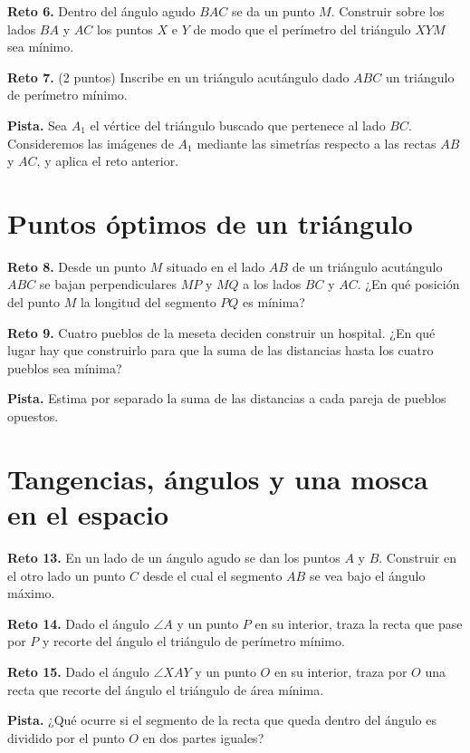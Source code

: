 \documentclass[11pt,a4paper]{article}
\begin{document}
\newpage

\textbf{Reto 6.} Dentro del ángulo agudo $BAC$ se da un punto $M$. Construir sobre los lados $BA$ y $AC$ los puntos $X$ e $Y$ de modo que el perímetro del triángulo $XYM$ sea mínimo.

\newpage

\textbf{Reto 7.} (2 puntos) Inscribe en un triángulo acutángulo dado $ABC$ un triángulo de perímetro mínimo.

\textbf{Pista.} Sea $A_1$ el vértice del triángulo buscado que pertenece al lado $BC$. Consideremos las imágenes de $A_1$ mediante las simetrías respecto a las rectas $AB$ y $AC$, y aplica el reto anterior.

\newpage

\section*{Puntos óptimos de un triángulo}

\textbf{Reto 8.} Desde un punto $M$ situado en el lado $AB$ de un triángulo acutángulo $ABC$ se bajan perpendiculares $MP$ y $MQ$ a los lados $BC$ y $AC$. ¿En qué posición del punto $M$ la longitud del segmento $PQ$ es mínima?

\newpage

\textbf{Reto 9.} Cuatro pueblos de la meseta deciden construir un hospital. ¿En qué lugar hay que construirlo para que la suma de las distancias hasta los cuatro pueblos sea mínima?

\textbf{Pista.} Estima por separado la suma de las distancias a cada pareja de pueblos opuestos.

\newpage

\section*{Tangencias, ángulos y una mosca en el espacio}

\textbf{Reto 13.} En un lado de un ángulo agudo se dan los puntos $A$ y $B$. Construir en el otro lado un punto $C$ desde el cual el segmento $AB$ se vea bajo el ángulo máximo.

\newpage

\textbf{Reto 14.} Dado el ángulo $\angle A$ y un punto $P$ en su interior, traza la recta que pase por $P$ y recorte del ángulo el triángulo de perímetro mínimo.

\newpage

\textbf{Reto 15.} Dado el ángulo $\angle XAY$ y un punto $O$ en su interior, traza por $O$ una recta que recorte del ángulo el triángulo de área mínima.

\textbf{Pista.} ¿Qué ocurre si el segmento de la recta que queda dentro del ángulo es dividido por el punto $O$ en dos partes iguales?
\end{document}
